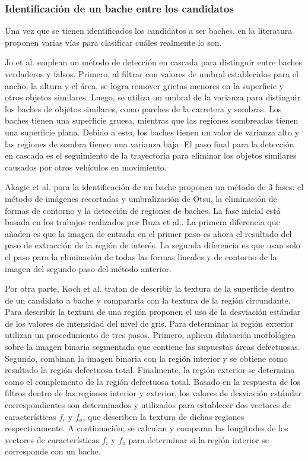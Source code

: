 		\subsubsection{Identificación de un bache entre los candidatos}
		Una vez que se tienen identificados los candidatos a ser baches, en la literatura proponen varias vías para  
		clasificar cuáles realmente lo son.

		Jo et al. emplean un método de detección en cascada para distinguir
		entre baches verdaderos y falsos. Primero, al filtrar con valores de umbral establecidos para el ancho, la
		altura y el área, se logra remover grietas menores en la superficie y otros objetos similares. Luego, 
		se utiliza un umbral de la varianza para distinguir los baches de objetos similares, como parches de 
		la carretera y sombras. Los baches tienen una superficie gruesa, mientras que las regiones sombreadas 
		tienen una superficie plana. Debido a esto, los baches tienen un valor de varianza alto y las regiones 
		de sombra tienen una varianza baja. El paso final para la detección en cascada es el seguimiento de 
		la trayectoria para eliminar los objetos similares causados por otros vehículos en movimiento. 
		

		Akagic et al. para la identificación de un bache proponen un método de 3 fases:
		el método de imágenes recortadas y umbralización de Otsu, la eliminación de formas de contorno y la detección 
		de regiones de baches. La fase inicial está basada en los trabajos realizados por  Buza et al..
		La primera diferencia que añaden es que la imagen de entrada en el primer paso es ahora el resultado del paso de extracción 
		de la región de interés. La segunda diferencia es que usan solo el paso para la eliminación de todas las formas lineales y de 
		contorno de la imagen del segundo paso del método anterior.

		Por otra parte, Koch et al. tratan de describir la textura de la superficie dentro de un candidato a bache y 
		compararla con la textura de la región circundante. Para describir la textura de una región proponen el uso de la desviación estándar de 
		los valores de intensidad del nivel de gris. Para determinar la región exterior utilizan un  procedimiento de tres pasos. Primero, 
		aplican dilatación morfológica sobre la imagen binaria segmentada que contiene las supuestas áreas defectuosas. Segundo, combinan la 
		imagen binaria con la región interior y se obtiene como resultado la región defectuosa total. Finalmente, la región exterior se determina 
		como el complemento de la región defectuosa total. Basado en la respuesta de los filtros dentro de las regiones interior y exterior, los 
		valores de desviación estándar correspondientes son determinados y utilizados para establecer dos vectores de características $f_i$ y $f_o$, 
		que describen la textura de dichas regiones respectivamente. A continuación, se calculan y comparan las longitudes de los vectores de 
		características $f_i$ y $f_o$ para determinar si la región interior se corresponde con un bache.

